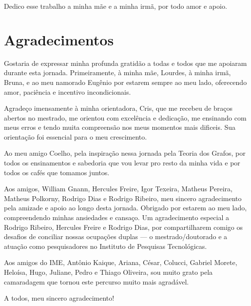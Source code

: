 
\begin{dedicatoria}
Dedico esse trabalho a minha mãe e a minha irmã, por todo amor e apoio.
\end{dedicatoria}


\chapter*{Agradecimentos}
Gostaria de expressar minha profunda gratidão a todas e todos que me apoiaram durante esta jornada.
Primeiramente, à minha mãe, Lourdes, à minha irmã, Bruna, e ao meu namorado Eugênio por estarem sempre ao meu lado, oferecendo amor, paciência e incentivo incondicionais.

Agradeço imensamente à minha orientadora, Cris, que me recebeu de braços abertos no mestrado, me orientou com excelência e dedicação, me ensinando com meus erros e tendo muita compreensão nos meus momentos mais dificeis.
Sua orientação foi essencial para o meu crescimento.

Ao meu amigo Coelho, pela inspiração nessa jornada pela Teoria dos Grafos, por todos os ensinamentos e sabedoria que vou levar pro resto da minha vida e por todos os cafés que tomamos juntos.

Aos amigos, William Gnann, Hercules Freire, Igor Texeira, Matheus Pereira, Matheus Polkorny, Rodrigo Dias e Rodrigo Ribeiro, meu sincero agradecimento pela amizade e apoio ao longo desta jornada.
Obrigado por estarem ao meu lado, compreendendo minhas ansiedades e cansaço.
Um agradecimento especial a Rodrigo Ribeiro, Hercules Freire e Rodrigo Dias, por compartilharem comigo os desafios de conciliar nossas ocupações duplas — o mestrado/doutorado e a atuação como pesquisadores no Instituto de Pesquisas Tecnológicas.

Aos amigos do IME, Antônio Kaique, Ariana, César, Colucci, Gabriel Morete, Heloísa, Hugo, Juliane, Pedro e Thiago Oliveira, sou muito grato pela camaradagem que tornou este percurso muito mais agradável.

A todos, meu sincero agradecimento!
